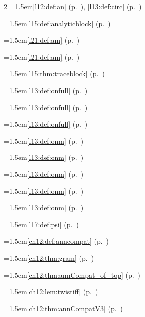 \begin{multicols}{2}
\hangindent=1.5em\quad \ref{l12:def:an} (p.~\pageref{l12:def:an}), \ref{l13:def:circ} (p.~\pageref{l13:def:circ})\par
\hangindent=1.5em\quad \ref{l15:def:analyticblock} (p.~\pageref{l15:def:analyticblock})\par
\hangindent=1.5em\quad \ref{l21:def:am} (p.~\pageref{l21:def:am})\par
\hangindent=1.5em\quad \ref{l21:def:am} (p.~\pageref{l21:def:am})\par
\hangindent=1.5em\quad \ref{l15:thm:traceblock} (p.~\pageref{l15:thm:traceblock})\par
\hangindent=1.5em\quad \ref{l13:def:onfull} (p.~\pageref{l13:def:onfull})\par
\hangindent=1.5em\quad \ref{l13:def:onfull} (p.~\pageref{l13:def:onfull})\par
\hangindent=1.5em\quad \ref{l13:def:onfull} (p.~\pageref{l13:def:onfull})\par
\hangindent=1.5em\quad \ref{l13:def:onm} (p.~\pageref{l13:def:onm})\par
\hangindent=1.5em\quad \ref{l13:def:onm} (p.~\pageref{l13:def:onm})\par
\hangindent=1.5em\quad \ref{l13:def:onm} (p.~\pageref{l13:def:onm})\par
\hangindent=1.5em\quad \ref{l13:def:onm} (p.~\pageref{l13:def:onm})\par
\hangindent=1.5em\quad \ref{l13:def:onm} (p.~\pageref{l13:def:onm})\par
\hangindent=1.5em\quad \ref{l17:def:psi} (p.~\pageref{l17:def:psi})\par
\hangindent=1.5em\quad \ref{ch12:def:anncompat} (p.~\pageref{ch12:def:anncompat})\par
\hangindent=1.5em\quad \ref{ch12:thm:gram} (p.~\pageref{ch12:thm:gram})\par
\hangindent=1.5em\quad \ref{ch12:thm:annCompat_of_top} (p.~\pageref{ch12:thm:annCompat_of_top})\par
\hangindent=1.5em\quad \ref{ch12:lem:twistiff} (p.~\pageref{ch12:lem:twistiff})\par
\hangindent=1.5em\quad \ref{ch12:thm:annCompatV3} (p.~\pageref{ch12:thm:annCompatV3})\par

\end{multicols}
